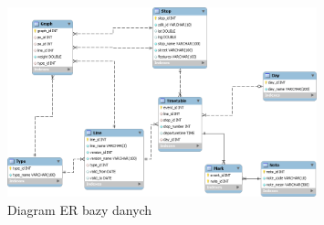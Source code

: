 \documentclass[a4paper,12pt]{article}
\begin{document}
 \begin{figure}[htp]
\centering
\includegraphics[width=0.8\textwidth]{schemat_bazy_danych} 
\caption{Diagram ER bazy danych}\label{schemat_bazy_danych}
\end{figure}
\end{document}
